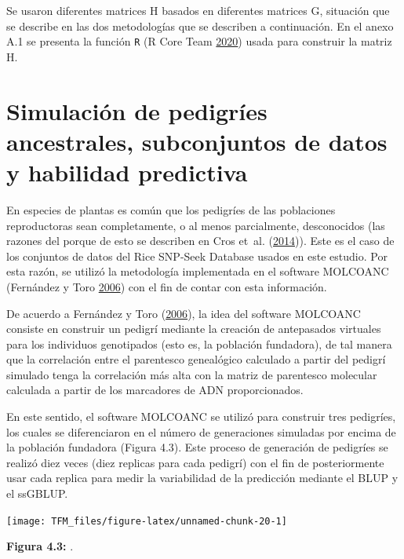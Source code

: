\documentclass[11pt,spanish,a4paper,oneside,]{book} %
\begin{document}
Se usaron diferentes matrices H basados en diferentes matrices G, situación que se describe en las dos metodologías que se describen a continuación. En el anexo A.1 se presenta la función \texttt{R} (R Core Team \protect\hyperlink{ref-cite:52}{2020}) usada para construir la matriz H.

\hypertarget{simulaciuxf3n-de-pedigruxedes-ancestrales-subconjuntos-de-datos-y-habilidad-predictiva}{%
\section{Simulación de pedigríes ancestrales, subconjuntos de datos y habilidad predictiva}\label{simulaciuxf3n-de-pedigruxedes-ancestrales-subconjuntos-de-datos-y-habilidad-predictiva}}

En especies de plantas es común que los pedigríes de las poblaciones reproductoras sean completamente, o al menos parcialmente, desconocidos (las razones del porque de esto se describen en Cros et~al. (\protect\hyperlink{ref-cite:48}{2014})). Este es el caso de los conjuntos de datos del Rice SNP-Seek Database usados en este estudio. Por esta razón, se utilizó la metodología implementada en el software MOLCOANC (Fernández y Toro \protect\hyperlink{ref-cite:24}{2006}) con el fin de contar con esta información.

De acuerdo a Fernández y Toro (\protect\hyperlink{ref-cite:24}{2006}), la idea del software MOLCOANC consiste en construir un pedigrí mediante la creación de antepasados virtuales para los individuos genotipados (esto es, la población fundadora), de tal manera que la correlación entre el parentesco genealógico calculado a partir del pedigrí simulado tenga la correlación más alta con la matriz de parentesco molecular calculada a partir de los marcadores de ADN proporcionados.

En este sentido, el software MOLCOANC se utilizó para construir tres pedigríes, los cuales se diferenciaron en el número de generaciones simuladas por encima de la población fundadora (Figura 4.3). Este proceso de generación de pedigríes se realizó diez veces (diez replicas para cada pedigrí) con el fin de posteriormente usar cada replica para medir la variabilidad de la predicción mediante el BLUP y el ssGBLUP.

\begin{center}\texttt{[image: TFM\_files/figure-latex/unnamed-chunk-20-1]} \end{center}

\begin{center}
\textbf{Figura 4.3:} .

\end{center}
\end{document}
